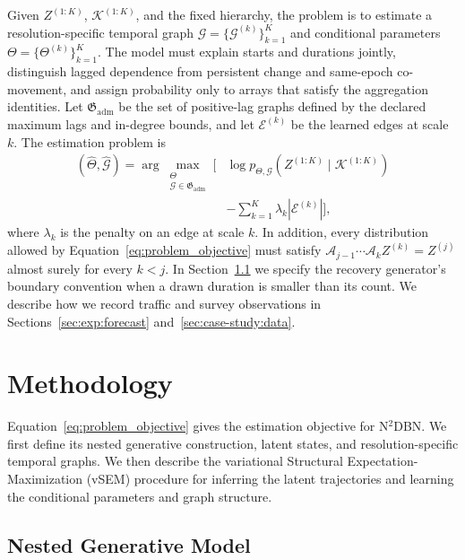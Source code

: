 \documentclass[sigconf]{acmart}
\begin{document}
Given \(Z^{(1:K)}\), \(\mathcal K^{(1:K)}\), and the fixed hierarchy, the problem is to estimate a resolution-specific temporal graph \(\mathcal G=\{\mathcal G^{(k)}\}_{k=1}^{K}\) and conditional parameters \(\Theta=\{\Theta^{(k)}\}_{k=1}^{K}\). The model must explain starts and durations jointly, distinguish lagged dependence from persistent change and same-epoch co-movement, and assign probability only to arrays that satisfy the aggregation identities. Let \(\mathfrak G_{\mathrm{adm}}\) be the set of positive-lag graphs defined by the declared maximum lags and in-degree bounds, and let \(\mathcal E^{(k)}\) be the learned edges at scale \(k\). The estimation problem is
\begin{align}
  (\widehat\Theta,\widehat{\mathcal G})
  =\arg\max_{\substack{\Theta\\
  \mathcal G\in\mathfrak G_{\mathrm{adm}}}}
  \Big[&\log p_{\Theta,\mathcal G}
  (Z^{(1:K)}\mid\mathcal K^{(1:K)})\nonumber\\[-2pt]
  &-\sum_{k=1}^{K}\lambda_k|\mathcal E^{(k)}|\Big],
  \label{eq:problem_objective}
\end{align}
where \(\lambda_k\) is the penalty on an edge at scale \(k\). In addition, every distribution allowed by Equation~\eqref{eq:problem_objective} must satisfy \(\mathcal A_{j-1}\cdots\mathcal A_kZ^{(k)}=Z^{(j)}\) almost surely for every \(k<j\). In Section~\ref{sec:nested_generative_model} we specify the recovery generator's boundary convention when a drawn duration is smaller than its count. We describe how we record traffic and survey observations in Sections~\ref{sec:exp:forecast} and~\ref{sec:case-study:data}.

\section{Methodology}
\label{sec:methodology}

Equation~\eqref{eq:problem_objective} gives the estimation objective for N$^2$DBN. We first define its nested generative construction, latent states, and resolution-specific temporal graphs. We then describe the variational Structural Expectation-Maximization (vSEM) procedure for inferring the latent trajectories and learning the conditional parameters and graph structure.

\subsection{Nested Generative Model}
\label{sec:nested_generative_model}
\end{document}
